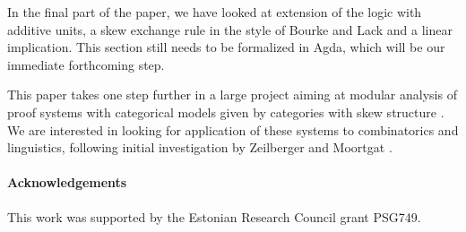 \documentclass[submission,copyright,creativecommons]{eptcs}
\theoremstyle{definition}
\begin{document}
In the final part of the paper, we have looked at extension of the logic with additive units, a skew exchange rule in the style of Bourke and Lack \cite{bourke:lack:braided:2020} and a linear implication. This section still needs to be formalized in Agda, which will be our immediate forthcoming step.

This paper takes one step further in a large project aiming at modular analysis of proof systems with categorical models given by categories with skew structure \cite{zeilberger:semiassociative:19, uustalu:sequent:2021,uustalu:proof:nodate,uustalu:deductive:nodate,veltri:coherence:2021,UVW:protsn}. We are interested in looking for application of these systems to combinatorics and linguistics, following initial investigation by Zeilberger \cite{zeilberger:semiassociative:19} and Moortgat \cite{moortgat:tamari:20}.


\paragraph{Acknowledgements}
This work was supported by the Estonian Research Council grant PSG749.

  
  
\end{document}
